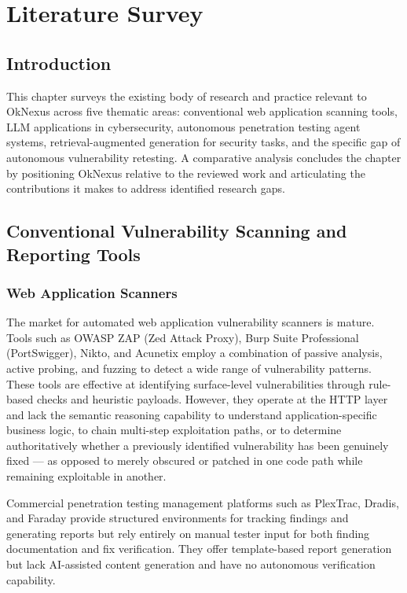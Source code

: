 \chapter{Literature Survey}

\section{Introduction}

This chapter surveys the existing body of research and practice relevant to OkNexus across five thematic areas: conventional web application scanning tools, LLM applications in cybersecurity, autonomous penetration testing agent systems, retrieval-augmented generation for security tasks, and the specific gap of autonomous vulnerability retesting. A comparative analysis concludes the chapter by positioning OkNexus relative to the reviewed work and articulating the contributions it makes to address identified research gaps.

\section{Conventional Vulnerability Scanning and Reporting Tools}

\subsection{Web Application Scanners}

The market for automated web application vulnerability scanners is mature. Tools such as OWASP ZAP (Zed Attack Proxy), Burp Suite Professional (PortSwigger), Nikto, and Acunetix employ a combination of passive analysis, active probing, and fuzzing to detect a wide range of vulnerability patterns. These tools are effective at identifying surface-level vulnerabilities through rule-based checks and heuristic payloads. However, they operate at the HTTP layer and lack the semantic reasoning capability to understand application-specific business logic, to chain multi-step exploitation paths, or to determine authoritatively whether a previously identified vulnerability has been genuinely fixed --- as opposed to merely obscured or patched in one code path while remaining exploitable in another.

Commercial penetration testing management platforms such as PlexTrac, Dradis, and Faraday provide structured environments for tracking findings and generating reports but rely entirely on manual tester input for both finding documentation and fix verification. They offer template-based report generation but lack AI-assisted content generation and have no autonomous verification capability.

